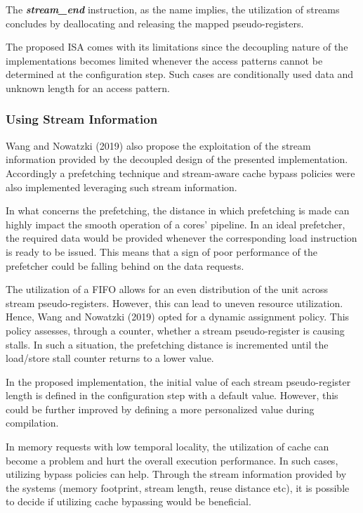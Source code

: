 The \textbf{\textit{stream\_end}} instruction, as the name implies, the utilization of streams concludes by deallocating and releasing the mapped pseudo-registers.

The proposed \acrshort{ISA} comes with its limitations since the decoupling nature of the implementations becomes limited whenever the access patterns cannot be determined at the configuration step. Such cases are conditionally used data and unknown length for an access pattern.


\subsubsection{Using Stream Information}
Wang and Nowatzki (2019) \cite{8980305} also propose the exploitation of the stream information provided by the decoupled design of the presented implementation. Accordingly a prefetching technique and stream-aware cache bypass policies were also implemented leveraging such stream information.

In what concerns the prefetching, the distance in which prefetching is made can highly impact the smooth operation of a cores' pipeline. In an ideal prefetcher, the required data would be provided whenever the corresponding load instruction is ready to be issued. This means that a sign of poor performance of the prefetcher could be falling behind on the data requests.

The utilization of a FIFO allows for an even distribution of the unit across stream pseudo-registers. However, this can lead to uneven resource utilization. Hence, Wang and Nowatzki (2019) \cite{8980305} opted for a dynamic assignment policy. This policy assesses, through a counter, whether a stream pseudo-register is causing stalls. In such a situation, the prefetching distance is incremented until the load/store stall counter returns to a lower value.

In the proposed implementation, the initial value of each stream pseudo-register length is defined in the configuration step with a default value. However, this could be further improved by defining a more personalized value during compilation.


In memory requests with low temporal locality, the utilization of cache can become a problem and hurt the overall execution performance. In such cases, utilizing bypass policies can help. 
Through the stream information provided by the systems (memory footprint, stream length, reuse distance etc),  it is possible to decide if utilizing cache bypassing would be beneficial.

